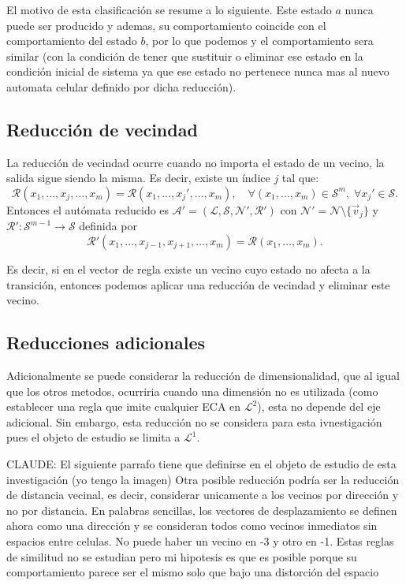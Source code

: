 El motivo de esta clasificación se resume a lo siguiente. Este estado $a$ nunca puede ser producido y ademas, su comportamiento coincide con el comportamiento del estado $b$, por lo que podemos y el comportamiento sera similar (con la condición de tener que sustituir o eliminar ese estado en la condición inicial de sistema ya que ese estado no pertenece nunca mas al nuevo automata celular definido por dicha reducción).

\subsection{Reducción de vecindad}

La reducción de vecindad ocurre cuando no importa el estado de un vecino, la salida sigue siendo la misma. Es decir, existe un índice $j$ tal que:
\[
\mathcal{R}(x_1, \dots, x_j, \dots, x_m) = \mathcal{R}(x_1, \dots, x_j', \dots, x_m), \quad \forall (x_1, \dots, x_m) \in \mathcal{S}^m, \; \forall x_j' \in \mathcal{S}.
\]
Entonces el autómata reducido es $\mathcal{A}' = (\mathcal{L}, \mathcal{S}, \mathcal{N}', \mathcal{R}')$ con $\mathcal{N}' = \mathcal{N} \setminus \{\vec{v}_j\}$ y $\mathcal{R}' : \mathcal{S}^{m-1} \to \mathcal{S}$ definida por
\[
\mathcal{R}'(x_1, \dots, x_{j-1}, x_{j+1}, \dots, x_m) = \mathcal{R}(x_1, \dots, x_m).
\]

Es decir, si en el vector de regla existe un vecino cuyo estado no afecta a la transición, entonces podemos aplicar una reducción de vecindad y eliminar este vecino. 

\subsection{Reducciones adicionales}

Adicionalmente se puede considerar la reducción de dimensionalidad, que al igual que los otros metodos, ocurriria cuando una dimensión no es utilizada (como establecer una regla que imite cualquier ECA en $\mathcal{L}^2$), esta no depende del eje adicional. Sin embargo, esta reducción no se considera para esta ivnestigación pues el objeto de estudio se limita a $\mathcal{L} ^1$.

CLAUDE: El siguiente parrafo tiene que definirse en el objeto de estudio de esta investigación (yo tengo la imagen)
Otra posible reducción podría ser la reducción de distancia vecinal, es decir, considerar unicamente a los vecinos por dirección y no por distancia. En palabras sencillas, los vectores de desplazamiento se definen ahora como una dirección y se consideran todos como vecinos inmediatos sin espacios entre celulas. No puede haber un vecino en -3 y otro en -1. Estas reglas de similitud no se estudian pero mi hipotesis es que es posible porque su comportamiento parece ser el mismo solo que bajo una distorción del espacio

